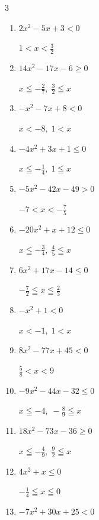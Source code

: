 \begin{multicols}{3}
\begin{enumerate}
  \item $2x^{2}-5x+3<0$

        $\displaystyle 1 < x < \frac{3}{2}$

  \item $14x^{2}-17x-6\geq 0$

        $\displaystyle x \leqq -\frac{2}{7} , \; \frac{3}{2} \leqq x$

  \item $-x^{2}-7x+8<0$

        $\displaystyle x < -8 , \; 1 < x$

\columnbreak %

\resetques

  \item $-4x^{2}+3x+1\leq 0$

        $\displaystyle x \leqq -\frac{1}{4} , \; 1 \leqq x$

  \item $-5x^{2}-42x-49>0$

        $\displaystyle -7 < x < -\frac{7}{5}$

  \item $-20x^{2}+x+12\leq 0$

        $\displaystyle x \leqq -\frac{3}{4} , \; \frac{4}{5} \leqq x$

  \item $6x^{2}+17x-14\leq 0$

        $\displaystyle -\frac{7}{2} \leqq x \leqq \frac{2}{3}$

  \item $-x^{2}+1<0$

        $\displaystyle x < -1 , \; 1 < x$

  \item $8x^{2}-77x+45<0$

        $\displaystyle \frac{5}{8} < x < 9$

  \item $-9x^{2}-44x-32\leq 0$

        $\displaystyle x \leqq -4 , \; -\frac{8}{9} \leqq x$

  \item $18x^{2}-73x-36\geq 0$

        $\displaystyle x \leqq -\frac{4}{9} , \; \frac{9}{2} \leqq x$

  \item $4x^{2}+x\leq 0$

        $\displaystyle -\frac{1}{4} \leqq x \leqq 0$

  \item $-7x^{2}+30x+25<0$


\end{enumerate}
\end{multicols}
